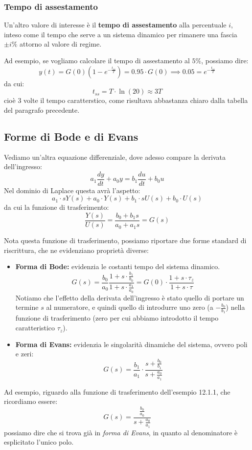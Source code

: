 \documentclass[a4paper,11pt]{article}
\begin{document}
\subsubsection{Tempo di assestamento}
Un'altro valore di interesse è il \textbf{tempo di assestamento} alla percentuale $i$, inteso come il tempo che serve a un sistema dinamico per rimanere una fascia $\pm i \%$ attorno al valore di regime.

Ad esempio, se vogliamo calcolare il tempo di assestamento al $5\%$, possiamo dire:
$$
y(t) = G(0) \left( 1 - e^{-\frac{t_{ss}}{T}} \right) = 0.95 \cdot G(0) \implies 0.05 = e^{-\frac{t_{ss}}{T}}
$$
da cui:
$$
t_{ss} = T \cdot \ln(20) \approx 3T
$$
cioè 3 volte il tempo caratterstico, come risultava abbastanza chiaro dalla tabella del paragrafo precedente.

\subsection{Forme di Bode e di Evans}
Vediamo un'altra equazione differenziale, dove adesso compare la derivata dell'ingresso:
$$
a_1 \frac{dy}{dt} + a_0 y = b_1 \frac{du}{dt} + b_0 u
$$
Nel dominio di Laplace questa avrà l'aspetto:
$$
a_1 \cdot s Y(s) + a_0 \cdot Y(s) + b_1 \cdot s U(s) + b_0 \cdot U(s)
$$
da cui la funzione di trasferimento:
$$
\frac{Y(s)}{U(s)} = \frac{b_0 + b_1 s}{a_0 + a_1 s} = G(s)
$$

Nota questa funzione di trasferimento, possiamo riportare due forme standard di riscrittura, che ne evidenziano proprietà diverse:
\begin{itemize}
	\item \textbf{Forma di Bode:} evidenzia le costanti tempo del sistema dinamico.
		$$
		G(s) = \frac{b_0}{a_0} \frac{1 + s \cdot \frac{b_1}{b_0}}{1 + s \cdot \frac{a_1}{a_0}} = G(0) \cdot \frac{1 + s \cdot \tau_z}{1 + s \cdot \tau}
		$$
		Notiamo che l'effetto della derivata dell'ingresso è stato quello di portare un termine $s$ al numeratore, e quindi quello di introdurre uno zero (a $-\frac{b_0}{b_1}$) nella funzione di trasferimento (zero per cui abbiamo introdotto il tempo caratteristico $\tau_z$).
	\item \textbf{Forma di Evans:} evidenzia le singolarità dinamiche del sistema, ovvero poli e zeri:
		$$
		G(s) = \frac{b_1}{a_1} \cdot \frac{s + \frac{b_0}{b_1}}{s + \frac{a_0}{a_1}}
		$$
\end{itemize}

Ad esempio, riguardo alla funzione di trasferimento dell'esempio 12.1.1, che ricordiamo essere:
$$
G(s) = \frac{\frac{b_0}{a_0}}{s + \frac{a_0}{a_1}}
$$
possiamo dire che si trova già in \textit{forma di Evans}, in quanto al denominatore è esplicitato l'unico polo.
\end{document}
